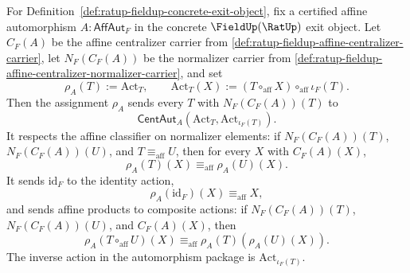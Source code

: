 \begin{theorem}
\label{thm:ratup-fieldup-affine-centralizer-normalizer-action-homomorphism}
For Definition~\ref{def:ratup-fieldup-concrete-exit-object}, fix a certified
affine automorphism $A:\mathsf{AffAut}_F$ in the concrete $\FieldUp(\RatUp)$
exit object. Let $C_F(A)$ be the affine centralizer carrier from
\autoref{def:ratup-fieldup-affine-centralizer-carrier}, let $N_F(C_F(A))$ be
the normalizer carrier from
\autoref{def:ratup-fieldup-affine-centralizer-normalizer-carrier}, and set
$$
\rho_A(T):=\mathrm{Act}_T,\qquad
\mathrm{Act}_T(X):=(T\circ_{\mathrm{aff}}X)\circ_{\mathrm{aff}}\iota_F(T).
$$
Then the assignment $\rho_A$ sends every $T$ with $N_F(C_F(A))(T)$ to
$$
\mathsf{CentAut}_A(\mathrm{Act}_T,\mathrm{Act}_{\iota_F(T)}).
$$
It respects the affine classifier on normalizer elements: if
$N_F(C_F(A))(T)$, $N_F(C_F(A))(U)$, and $T\equiv_{\mathrm{aff}}U$, then for
every $X$ with $C_F(A)(X)$,
$$
\rho_A(T)(X)\equiv_{\mathrm{aff}}\rho_A(U)(X).
$$
It sends $\mathrm{id}_F$ to the identity action,
$$
\rho_A(\mathrm{id}_F)(X)\equiv_{\mathrm{aff}}X,
$$
and sends affine products to composite actions: if $N_F(C_F(A))(T)$,
$N_F(C_F(A))(U)$, and $C_F(A)(X)$, then
$$
\rho_A(T\circ_{\mathrm{aff}}U)(X)\equiv_{\mathrm{aff}}
\rho_A(T)(\rho_A(U)(X)).
$$
The inverse action in the automorphism package is
$\mathrm{Act}_{\iota_F(T)}$.
\end{theorem}
